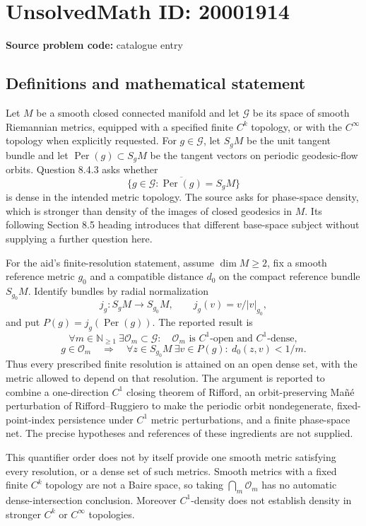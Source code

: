 \documentclass[11pt]{article}
\newcommand{\N}{\mathbb{N}}
\begin{document}
\section*{UnsolvedMath ID: 20001914}
\textbf{Source problem code:} catalogue entry
\subsection{Definitions and mathematical statement}
Let \(M\) be a smooth closed connected manifold and let \(\mathcal G\) be its space of smooth Riemannian metrics, equipped with a specified finite \(C^k\) topology, or with the \(C^\infty\) topology when explicitly requested. For \(g\in\mathcal G\), let \(S_gM\) be the unit tangent bundle and let \(\operatorname{Per}(g)\subset S_gM\) be the tangent vectors on periodic geodesic-flow orbits. Question 8.4.3 asks whether
\[
 \{g\in\mathcal G:\overline{\operatorname{Per}(g)}=S_gM\}
\]
is dense in the intended metric topology. The source asks for phase-space density, which is stronger than density of the images of closed geodesics in \(M\). Its following Section 8.5 heading introduces that different base-space subject without supplying a further question here.

For the aid's finite-resolution statement, assume \(\dim M\geq2\), fix a smooth reference metric \(g_0\) and a compatible distance \(d_0\) on the compact reference bundle \(S_{g_0}M\). Identify bundles by radial normalization
\[
 j_g:S_gM\to S_{g_0}M,\qquad j_g(v)=v/|v|_{g_0},
\]
and put \(P(g)=j_g(\operatorname{Per}(g))\). The reported result is
\[
 \forall m\in\N_{\geq1}\ \exists\mathcal O_m\subset\mathcal G:
 \quad\mathcal O_m\text{ is }C^1\text{-open and }C^1\text{-dense},
\]
\[
 g\in\mathcal O_m\quad\Longrightarrow\quad
 \forall z\in S_{g_0}M\ \exists v\in P(g):\ d_0(z,v)<1/m.
\]
Thus every prescribed finite resolution is attained on an open dense set, with the metric allowed to depend on that resolution. The argument is reported to combine a one-direction \(C^1\) closing theorem of Rifford, an orbit-preserving Ma\~n\'e perturbation of Rifford--Ruggiero to make the periodic orbit nondegenerate, fixed-point-index persistence under \(C^1\) metric perturbations, and a finite phase-space net. The precise hypotheses and references of these ingredients are not supplied.

This quantifier order does not by itself provide one smooth metric satisfying every resolution, or a dense set of such metrics. Smooth metrics with a fixed finite \(C^k\) topology are not a Baire space, so taking \(\bigcap_m\mathcal O_m\) has no automatic dense-intersection conclusion. Moreover \(C^1\)-density does not establish density in stronger \(C^k\) or \(C^\infty\) topologies.
\end{document}
